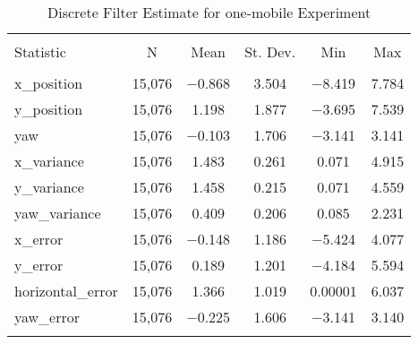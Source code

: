 
\begin{table}[h] \centering 
  \caption{Discrete Filter Estimate for one-mobile Experiment} 
  \label{tab:one_mobile_discrete_summary} 
\begin{tabular}{@{\extracolsep{5pt}}lccccc} 
\\[-1.8ex]\hline 
\hline \\[-1.8ex] 
Statistic & \multicolumn{1}{c}{N} & \multicolumn{1}{c}{Mean} & \multicolumn{1}{c}{St. Dev.} & \multicolumn{1}{c}{Min} & \multicolumn{1}{c}{Max} \\ 
\hline \\[-1.8ex] 
x\_position & 15,076 & $-$0.868 & 3.504 & $-$8.419 & 7.784 \\ 
y\_position & 15,076 & 1.198 & 1.877 & $-$3.695 & 7.539 \\ 
yaw & 15,076 & $-$0.103 & 1.706 & $-$3.141 & 3.141 \\ 
x\_variance & 15,076 & 1.483 & 0.261 & 0.071 & 4.915 \\ 
y\_variance & 15,076 & 1.458 & 0.215 & 0.071 & 4.559 \\ 
yaw\_variance & 15,076 & 0.409 & 0.206 & 0.085 & 2.231 \\ 
x\_error & 15,076 & $-$0.148 & 1.186 & $-$5.424 & 4.077 \\ 
y\_error & 15,076 & 0.189 & 1.201 & $-$4.184 & 5.594 \\ 
horizontal\_error & 15,076 & 1.366 & 1.019 & 0.00001 & 6.037 \\ 
yaw\_error & 15,076 & $-$0.225 & 1.606 & $-$3.141 & 3.140 \\ 
\hline \\[-1.8ex] 
\end{tabular} 
\end{table} 
